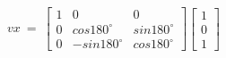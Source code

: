 \documentclass[preview]{standalone}
\begin{document}
\begin{align*}
vx\ =\ \begin{bmatrix}
                        1 & 0 & 0\\
                        0 & cos180^\circ & sin180^\circ\\
                        0 & -sin180^\circ & cos180^\circ
                        \end{bmatrix}\begin{bmatrix}
                        1\\
                        0\\
                        1
                        \end{bmatrix}\\
\end{align*}
\end{document}
